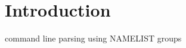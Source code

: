     

    \hypertarget{index_Introduction}{}\section{Introduction}\label{index_Introduction}
command line parsing using N\+A\+M\+E\+L\+I\+ST groups

      